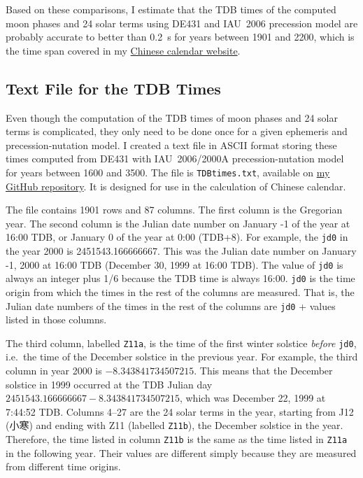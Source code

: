 \documentclass[12pt]{article}
\begin{document}
\begin{CJK}{UTF8}{bkai}
Based on these comparisons, I estimate that the TDB times of the computed moon 
phases and 24 solar terms using DE431 and IAU~2006 precession model are 
probably accurate to better than 0.2~s for years 
between 1901 and 2200, which is the time span covered in my 
\href{../index.html}{Chinese calendar website}.

\subsection{Text File for the TDB Times}

Even though the computation of the TDB times of moon phases and 24 solar terms 
is complicated, they only need to be done once for a given ephemeris 
and precession-nutation model. I created a text file in ASCII format 
storing these times computed from DE431 with IAU~2006/2000A precession-nutation 
model for years between 1600 and 3500. The file is {\tt TDBtimes.txt}, available 
on \href{https://github.com/ytliu0/ChineseCalendar}{my GitHub repository}. 
It is designed for use in the calculation of 
Chinese calendar.

The file contains 1901 rows and 87 columns. The first column is the 
Gregorian year. The second column is the Julian date number on 
January -1 of the year at 16:00 TDB, or January 0 of the year at 0:00 (TDB+8). 
For example, the {\tt jd0} in the year 2000 is 2451543.166666667. This was 
the Julian date number on January -1, 2000 at 16:00 TDB (December 30, 1999 at 16:00 TDB). 
The value of {\tt jd0} is always an integer plus 1/6 because the TDB time is always 16:00. 
{\tt jd0} is the time origin from which the times in the rest of the columns are measured. 
That is, the Julian date numbers of the times in the rest of the columns are 
{\tt jd0} + values listed in those columns. 

The third column, labelled {\tt Z11a}, is the time of the first winter solstice 
{\em before} {\tt jd0}, i.e.\ the time of the December solstice in the previous year. 
For example, the third column in year 2000 is $-8.343841734507215$. This means that 
the December solstice in 1999 occurred at the TDB Julian day 
$2451543.166666667-8.343841734507215$, which was December 22, 1999 at 7:44:52 TDB. 
Columns 4--27 are the 24 solar terms in the year, starting from J12 (小寒) and 
ending with Z11 (labelled {\tt Z11b}), the December solstice in the year. 
Therefore, the time listed in column {\tt Z11b} is the same as the time listed 
in {\tt Z11a} in the following year. Their values are different simply because they 
are measured from different time origins.


\end{CJK}
\end{document}

